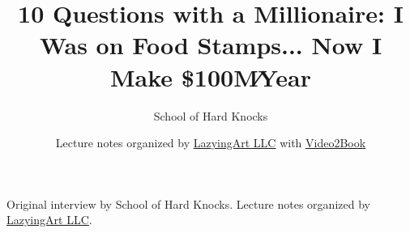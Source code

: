 \documentclass[11pt,oneside]{book}
\begin{document}
\frontmatter
\title{10 Questions with a Millionaire: I Was on Food Stamps... Now I Make \$100M∕Year}
\author{School of Hard Knocks}
\date{Lecture notes organized by \href{https://lazying.art}{LazyingArt LLC} with \href{https://github.com/lachlanchen/Video2Book}{Video2Book}}
\maketitle
\begin{center}
\small Original interview by School of Hard Knocks. Lecture notes organized by \href{https://lazying.art}{LazyingArt LLC}.
\end{center}
\clearpage
\mainmatter

\end{document}
